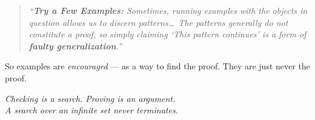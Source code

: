 \begin{bookbox}[title={Diedrichs \& Lovett name the error, §2.3.6}]
\begin{quote}\itshape
``\textbf{Try a Few Examples:} Sometimes, running examples with the objects in question allows us to
discern patterns\ldots\ The patterns generally do not constitute a proof, so simply claiming `This
pattern continues' is a form of \textbf{faulty generalization}.''
\end{quote}
So examples are \emph{encouraged} --- as a way to find the proof. They are just never the proof.
\end{bookbox}

\begin{dobox}[title={The one sentence to carry}]
\begin{center}\itshape\large
Checking is a search. Proving is an argument.\\
A search over an infinite set never terminates.
\end{center}
\end{dobox}
